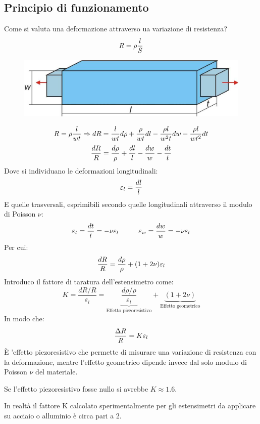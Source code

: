 \documentclass[a4paper, 15pt]{article}
\begin{document}
\subsection{Principio di funzionamento}		
\begin{adjustwidth}{2in}{}						
		Come si valuta una deformazione attraverso ua variazione di resistenza? 
		\[R = \rho {l\over S}\]		
\begin{figure}[H]
	\centering
	\includegraphics[width=0.5\linewidth]{immagini/3}
	\label{fig:screenshot3}
\end{figure}
		\[R = \rho {l\over wt}\Rightarrow dR = {l\over wt}d\rho + {\rho\over wt}dl - {\rho l\over w^2t}dw - {\rho l\over wt^2}dt\]	
		\[{dR\over R} = {d\rho\over\rho} + {dl\over l} - {dw\over w} -{dt\over t}\]	
		Dove si individuano le deformazioni longitudinali:
		\[\varepsilon_l = {dl\over l}\] 
		E quelle trasversali, esprimibili secondo quelle longitudinali attraverso il modulo di Poisson $\nu$: 
		\[\varepsilon_t = {dt\over t} = -\nu\varepsilon_l \hspace{1cm}
		\varepsilon_w = {dw\over w} = -\nu\varepsilon_l \]
		Per cui: 
		\[{dR\over R} = {d\rho\over\rho} + (1+2\nu)\varepsilon_l\]
		Introduco il fattore di taratura dell'estensimetro come: 
		\[K = \dfrac{dR/R}{\varepsilon_l} = \underbrace{\dfrac{d\rho/\rho}{\varepsilon_l}}_{\text{Effetto piezoresistivo}} + \underbrace{(1+2\nu)}_{\text{Effetto geometrico}}\]
		In modo che: 
		\[{\Delta R\over R} = K\varepsilon_l\]
		È 'effetto piezoresistivo che permette di misurare una variazione di resistenza con la deformazione, mentre l'effetto geometrico dipende invece dal solo modulo di Poisson $\nu$ del materiale. 
		
		Se l’effetto piezoresistivo fosse
		nullo si avrebbe $ K\approx1.6 $.
		
		In realtà il fattore K calcolato
		sperimentalmente per gli estensimetri
		da applicare su acciaio o alluminio
		è circa pari a 2.  
\end{adjustwidth}
\newpage
\end{document}
